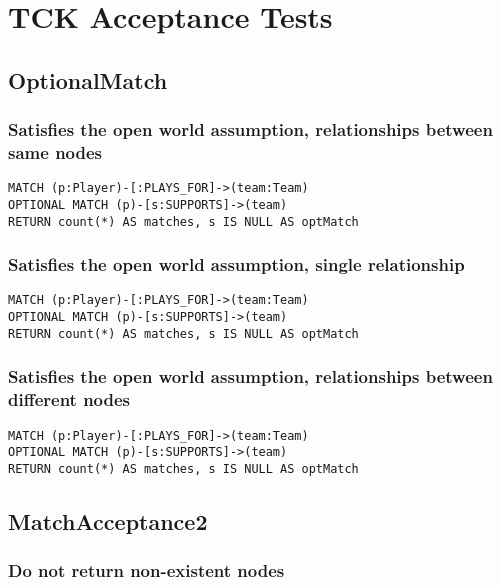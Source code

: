 \chapter{TCK Acceptance Tests}

\section{OptionalMatch}


\subsection{Satisfies the open world assumption, relationships between same nodes}

\begin{lstlisting}
MATCH (p:Player)-[:PLAYS_FOR]->(team:Team)
OPTIONAL MATCH (p)-[s:SUPPORTS]->(team)
RETURN count(*) AS matches, s IS NULL AS optMatch
\end{lstlisting}

\subsection{Satisfies the open world assumption, single relationship}

\begin{lstlisting}
MATCH (p:Player)-[:PLAYS_FOR]->(team:Team)
OPTIONAL MATCH (p)-[s:SUPPORTS]->(team)
RETURN count(*) AS matches, s IS NULL AS optMatch
\end{lstlisting}

\subsection{Satisfies the open world assumption, relationships between different nodes}

\begin{lstlisting}
MATCH (p:Player)-[:PLAYS_FOR]->(team:Team)
OPTIONAL MATCH (p)-[s:SUPPORTS]->(team)
RETURN count(*) AS matches, s IS NULL AS optMatch
\end{lstlisting}
\section{MatchAcceptance2}


\subsection{Do not return non-existent nodes}

